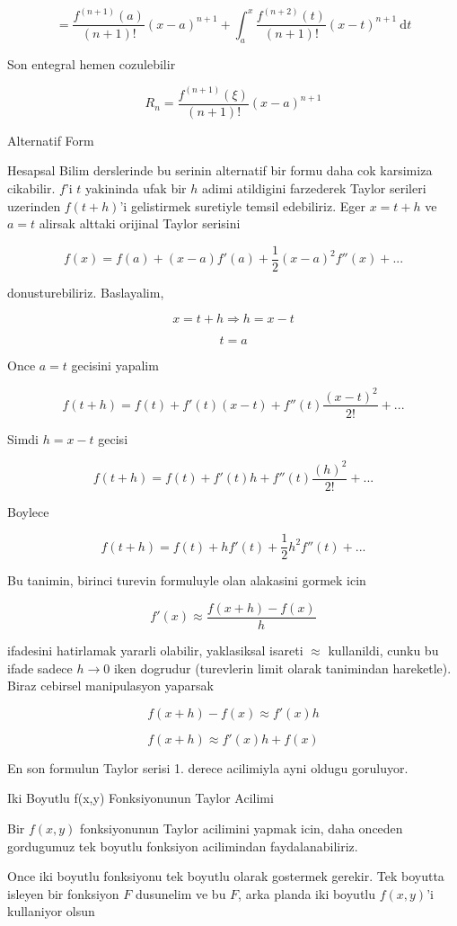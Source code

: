 \documentclass[12pt,fleqn]{article}\usepackage{../common}
\begin{document}
$$ = \frac{f^{(n+1)} (a)}{(n+1)!} (x - a)^{n+1} + \int_a^x \frac{f^{(n+2)} \left({t}\right)} {(n+1)!} \left({x - t}\right)^{n+1} \ \mathrm d t $$

Son entegral hemen cozulebilir

$$ R_n = \frac{f^{(n+1)}(\xi)}{(n+1)!} (x-a)^{n+1} $$

Alternatif Form

Hesapsal Bilim derslerinde bu serinin alternatif bir formu daha cok
karsimiza cikabilir. $f$'i $t$ yakininda ufak bir $h$ adimi atildigini
farzederek Taylor serileri uzerinden $f(t+h)$'i gelistirmek suretiyle
temsil edebiliriz. Eger $x = t+h$ ve $a = t$ alirsak alttaki orijinal
Taylor serisini

$$ f(x) = f (a)+(x-a) f'(a) + \frac1 2 (x-a)^2f''(x) + ...$$

donusturebiliriz. Baslayalim,

$$ x = t + h \Rightarrow h = x-t $$

$$ t = a $$

Once $a=t$ gecisini yapalim

$$ f(t+h) = f(t) +  f'(t)(x-t) + f''(t)\frac{(x-t)^2}{2!} + ...$$

Simdi $h = x-t$ gecisi

$$ f(t+h) = f(t) +  f'(t)h + f''(t)\frac{(h)^2}{2!} + ...$$

Boylece

$$ f(t+h) = f (t)+h f'(t) + \frac 1 2 h^2 f''(t) + ...$$

Bu tanimin, birinci turevin formuluyle olan alakasini gormek icin

$$ f'(x) \approx \frac {f(x+h) - f(x)}{h} $$

ifadesini hatirlamak yararli olabilir, yaklasiksal isareti $\approx$
kullanildi, cunku bu ifade sadece $h \to 0$ iken dogrudur (turevlerin limit
olarak tanimindan hareketle). Biraz cebirsel manipulasyon yaparsak

$$ f(x+h) - f(x) \approx f'(x)h  $$

$$ f(x+h)  \approx f'(x)h + f(x) $$

En son formulun Taylor serisi 1. derece acilimiyla ayni oldugu goruluyor. 

Iki Boyutlu f(x,y) Fonksiyonunun Taylor Acilimi

Bir $f(x,y)$ fonksiyonunun Taylor acilimini yapmak icin, daha onceden
gordugumuz tek boyutlu fonksiyon acilimindan faydalanabiliriz. 

Once iki boyutlu fonksiyonu tek boyutlu olarak gostermek gerekir. Tek
boyutta isleyen bir fonksiyon $F$ dusunelim ve bu $F$, arka planda iki
boyutlu $f(x,y)$'i kullaniyor olsun
\end{document}
